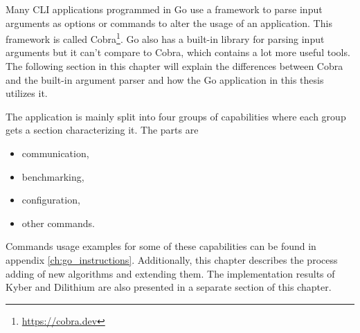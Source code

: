 Many CLI applications programmed in Go use a framework to parse input arguments as options or commands to alter the usage of an application. This framework is called Cobra\footnote{\url{https://cobra.dev}}. Go also has a built-in library for parsing input arguments but it can't compare to Cobra, which contains a lot more useful tools. The following section in this chapter will explain the differences between Cobra and the built-in argument parser and how the Go application in this thesis utilizes it.

The application is mainly split into four groups of capabilities where each group gets a section characterizing it. The parts are
\begin{itemize}
  \item communication,
  \item benchmarking,
  \item configuration,
  \item other commands.
\end{itemize}
\noindent Commands usage examples for some of these capabilities can be found in appendix \ref{ch:go_instructions}. Additionally, this chapter describes the process adding of new algorithms and extending them. The implementation results of Kyber and Dilithium are also presented in a separate section of this chapter.

